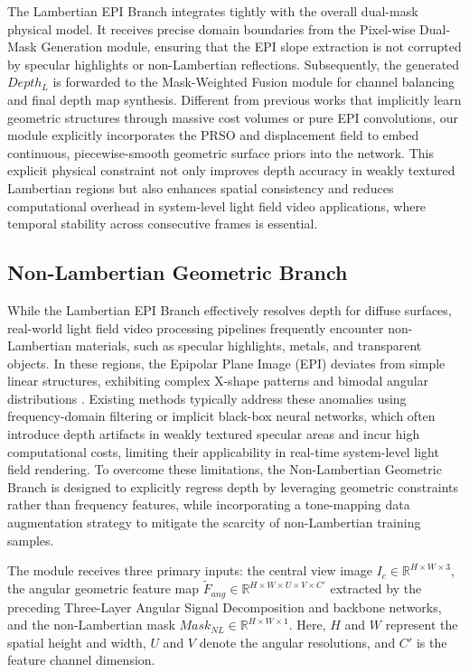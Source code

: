 \documentclass[lettersize,journal]{IEEEtran}
\begin{document}
The Lambertian EPI Branch integrates tightly with the overall dual-mask physical model. It receives precise domain boundaries from the Pixel-wise Dual-Mask Generation module, ensuring that the EPI slope extraction is not corrupted by specular highlights or non-Lambertian reflections. Subsequently, the generated $Depth_L$ is forwarded to the Mask-Weighted Fusion module for channel balancing and final depth map synthesis. Different from previous works that implicitly learn geometric structures through massive cost volumes or pure EPI convolutions, our module explicitly incorporates the PRSO and displacement field to embed continuous, piecewise-smooth geometric surface priors into the network. This explicit physical constraint not only improves depth accuracy in weakly textured Lambertian regions but also enhances spatial consistency and reduces computational overhead in system-level light field video applications, where temporal stability across consecutive frames is essential.

\subsection{Non-Lambertian Geometric Branch}

While the Lambertian EPI Branch effectively resolves depth for diffuse surfaces, real-world light field video processing pipelines frequently encounter non-Lambertian materials, such as specular highlights, metals, and transparent objects. In these regions, the Epipolar Plane Image (EPI) deviates from simple linear structures, exhibiting complex X-shape patterns and bimodal angular distributions \cite{dosovitskiy2021}. Existing methods typically address these anomalies using frequency-domain filtering or implicit black-box neural networks, which often introduce depth artifacts in weakly textured specular areas and incur high computational costs, limiting their applicability in real-time system-level light field rendering. To overcome these limitations, the Non-Lambertian Geometric Branch is designed to explicitly regress depth by leveraging geometric constraints rather than frequency features, while incorporating a tone-mapping data augmentation strategy to mitigate the scarcity of non-Lambertian training samples.

The module receives three primary inputs: the central view image $I_c \in \mathbb{R}^{H \times W \times 3}$, the angular geometric feature map $\tilde{F}_{ang} \in \mathbb{R}^{H \times W \times U \times V \times C'}$ extracted by the preceding Three-Layer Angular Signal Decomposition and backbone networks, and the non-Lambertian mask $Mask_{NL} \in \mathbb{R}^{H \times W \times 1}$. Here, $H$ and $W$ represent the spatial height and width, $U$ and $V$ denote the angular resolutions, and $C'$ is the feature channel dimension. 
\end{document}
